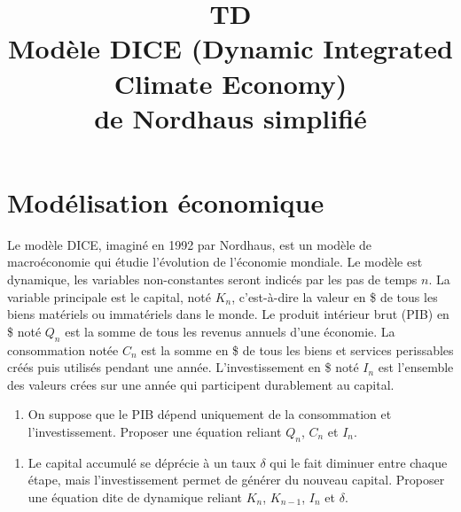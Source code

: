 \documentclass[12pt]{article}
\title{TD \\Modèle 
DICE (Dynamic Integrated Climate Economy) \\
de Nordhaus simplifié }
\newcommand{\rep}[1]{\textit{Réponse :} #1 \\}
\renewcommand{\rep}[1]{ }
\theoremstyle{remark}
\begin{document}
\maketitle


\section{Modélisation économique}

Le modèle DICE, imaginé en 1992 par Nordhaus, est un modèle de macroéconomie qui étudie l'évolution de l'économie mondiale.
Le modèle est dynamique, les variables non-constantes seront indicés par les pas de temps $n$.
La variable principale est le capital, noté $K_n$, c'est-à-dire la valeur en \$ de tous les biens matériels ou immatériels dans le monde.
Le produit intérieur brut (PIB) en \$ noté $Q_n$ est la somme de tous les revenus annuels d'une économie.
La consommation notée $C_n$ est la somme en \$ de tous les biens et services perissables créés puis utilisés pendant une année.
L'investissement en \$ noté $I_n$ est l'ensemble des valeurs crées sur une année qui participent durablement au capital.

\begin{enumerate}
\item On suppose que le PIB dépend uniquement de la consommation et l'investissement. Proposer une équation reliant $Q_n$, $C_n$ et $I_n$.
\end{enumerate}
\rep{ $Q_{n}=C_n + I_n$ }
\begin{enumerate}[resume]
\item  Le capital accumulé se déprécie à un taux $\delta$ qui le fait diminuer entre chaque étape, mais l'investissement permet de générer du nouveau capital. Proposer une équation dite de dynamique reliant $K_{n}$, $K_{n-1}$, $I_n$ et $\delta$.
\end{enumerate}
\rep{ $K_{n}=(1-\delta)K_{n-1}+I_n$ }
\end{document}
